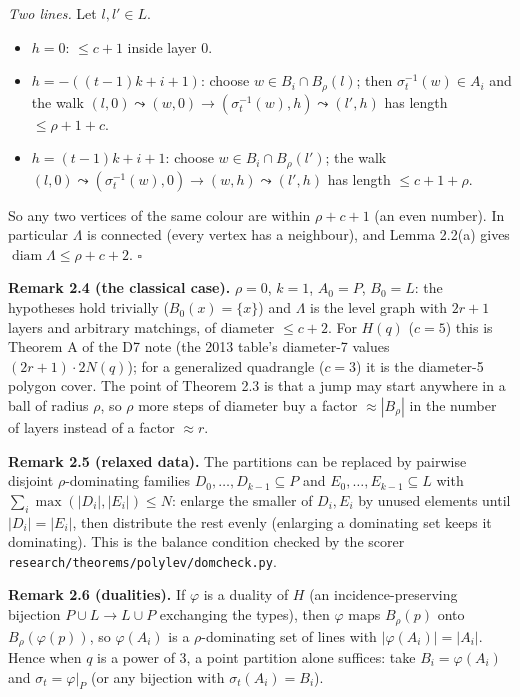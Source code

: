 \documentclass[
  10pt,
]{article}
\providecommand{\tightlist}{%
  \setlength{\itemsep}{0pt}\setlength{\parskip}{0pt}}
\begin{document}
\emph{Two lines.} Let \(l, l'\in L\).

\begin{itemize}
\tightlist
\item
  \(h = 0\): \(\le c+1\) inside layer 0.
\item
  \(h = -((t-1)k+i+1)\): choose \(w\in B_i\cap B_\rho(l)\); then
  \(\sigma_t^{-1}(w)\in A_i\) and the walk
  \((l,0)\leadsto(w,0)\to(\sigma_t^{-1}(w),h)\leadsto(l',h)\) has length
  \(\le\rho+1+c\).
\item
  \(h = (t-1)k+i+1\): choose \(w\in B_i\cap B_\rho(l')\); the walk
  \((l,0)\leadsto(\sigma_t^{-1}(w),0)\to(w,h)\leadsto(l',h)\) has length
  \(\le c+1+\rho\).
\end{itemize}

So any two vertices of the same colour are within \(\rho+c+1\) (an even
number). In particular \(\Lambda\) is connected (every vertex has a
neighbour), and Lemma 2.2(a) gives
\(\operatorname{diam}\Lambda\le\rho+c+2\). \(\square\)

\textbf{Remark 2.4 (the classical case).} \(\rho = 0\), \(k = 1\),
\(A_0 = P\), \(B_0 = L\): the hypotheses hold trivially
(\(B_0(x) = \{x\}\)) and \(\Lambda\) is the level graph with \(2r+1\)
layers and arbitrary matchings, of diameter \(\le c+2\). For \(H(q)\)
(\(c = 5\)) this is Theorem A of the D7 note (the 2013 table's
diameter-7 values \((2r+1)\cdot 2N(q)\)); for a generalized quadrangle
(\(c=3\)) it is the diameter-5 polygon cover. The point of Theorem 2.3
is that a jump may start anywhere in a ball of radius \(\rho\), so
\(\rho\) more steps of diameter buy a factor \(\approx|B_\rho|\) in the
number of layers instead of a factor \(\approx r\).

\textbf{Remark 2.5 (relaxed data).} The partitions can be replaced by
pairwise disjoint \(\rho\)-dominating families
\(D_0,\dots,D_{k-1}\subseteq P\) and \(E_0,\dots,E_{k-1}\subseteq L\)
with \(\sum_i\max(|D_i|,|E_i|)\le N\): enlarge the smaller of
\(D_i, E_i\) by unused elements until \(|D_i| = |E_i|\), then distribute
the rest evenly (enlarging a dominating set keeps it dominating). This
is the balance condition checked by the scorer
\texttt{research/theorems/polylev/domcheck.py}.

\textbf{Remark 2.6 (dualities).} If \(\varphi\) is a duality of \(H\)
(an incidence-preserving bijection \(P\cup L\to L\cup P\) exchanging the
types), then \(\varphi\) maps \(B_\rho(p)\) onto \(B_\rho(\varphi(p))\),
so \(\varphi(A_i)\) is a \(\rho\)-dominating set of lines with
\(|\varphi(A_i)| = |A_i|\). Hence when \(q\) is a power of 3, a point
partition alone suffices: take \(B_i = \varphi(A_i)\) and
\(\sigma_t = \varphi|_P\) (or any bijection with
\(\sigma_t(A_i) = B_i\)).
\end{document}
